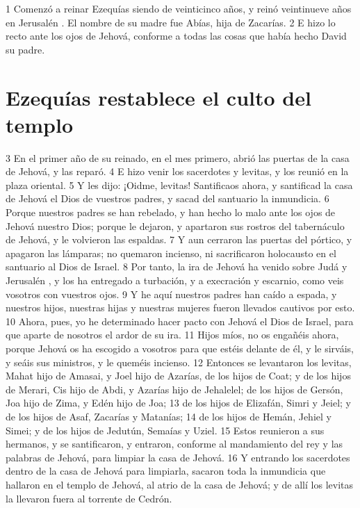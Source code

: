 1 Comenzó a reinar Ezequías siendo de veinticinco años, y reinó veintinueve años en Jerusalén . El nombre de su madre fue Abías, hija de Zacarías.
2 E hizo lo recto ante los ojos de Jehová, conforme a todas las cosas que había hecho David su padre.

\section*{Ezequías restablece el culto del templo}

3 En el primer año de su reinado, en el mes primero, abrió las puertas de la casa de Jehová, y las reparó.
4 E hizo venir los sacerdotes y levitas, y los reunió en la plaza oriental.
5 Y les dijo: ¡Oidme, levitas! Santificaos ahora, y santificad la casa de Jehová el Dios de vuestros padres, y sacad del santuario la inmundicia.
6 Porque nuestros padres se han rebelado, y han hecho lo malo ante los ojos de Jehová nuestro Dios; porque le dejaron, y apartaron sus rostros del tabernáculo de Jehová, y le volvieron las espaldas.
7 Y aun cerraron las puertas del pórtico, y apagaron las lámparas; no quemaron incienso, ni sacrificaron holocausto en el santuario al Dios de Israel.
8 Por tanto, la ira de Jehová ha venido sobre Judá y Jerusalén , y los ha entregado a turbación, y a execración y escarnio, como veis vosotros con vuestros ojos. 
9 Y he aquí nuestros padres han caído a espada, y nuestros hijos, nuestras hijas y nuestras mujeres fueron llevados cautivos por esto.
10 Ahora, pues, yo he determinado hacer pacto con Jehová el Dios de Israel, para que aparte de nosotros el ardor de su ira.
11 Hijos míos, no os engañéis ahora, porque Jehová os ha escogido a vosotros para que estéis delante de él, y le sirváis, y seáis sus ministros, y le queméis incienso.
12 Entonces se levantaron los levitas, Mahat hijo de Amasai, y Joel hijo de Azarías, de los hijos de Coat; y de los hijos de Merari, Cis hijo de Abdi, y Azarías hijo de Jehalelel; de los hijos de Gersón, Joa hijo de Zima, y Edén hijo de Joa;
13 de los hijos de Elizafán, Simri y Jeiel; y de los hijos de Asaf, Zacarías y Matanías;
14 de  los hijos de Hemán, Jehiel y Simei; y de los hijos de Jedutún, Semaías y Uziel.
15 Estos reunieron a sus hermanos, y se santificaron, y entraron, conforme al mandamiento del rey y las palabras de Jehová, para limpiar la casa de Jehová.
16 Y entrando los sacerdotes dentro de la casa de Jehová para limpiarla, sacaron toda la inmundicia que hallaron en el templo de Jehová, al atrio de la casa de Jehová; y de allí los levitas la llevaron fuera al torrente de Cedrón.
